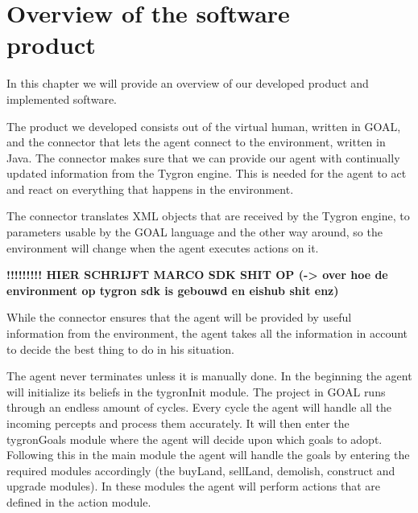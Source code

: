 \chapter[Overview of the software product]{Overview of the software \\ product}
In this chapter we will provide an overview of our developed product and implemented software.

The product we developed consists out of the virtual human, written in GOAL, and the connector that lets the agent connect to the environment, written in Java. The connector makes sure that we can provide our agent with continually updated information from the Tygron engine. This is needed for the agent to act and react on everything that happens in the environment.

The connector translates XML objects that are received by the Tygron engine, to parameters usable by the GOAL language and the other way around, so the environment will change when the agent executes actions on it.

\textbf{!!!!!!!!! HIER SCHRIJFT MARCO SDK SHIT OP (-> over hoe de environment op tygron sdk is gebouwd en eishub shit enz)}

While the connector ensures that the agent will be provided by useful information from the environment, the agent takes all the information in account to decide the best thing to do in his situation. 

The agent never terminates unless it is manually done. In the beginning the agent will initialize its beliefs in the tygronInit module. The project in GOAL runs through an endless amount of cycles. Every cycle the agent will handle all the incoming percepts and process them accurately. It will then enter the tygronGoals module where the agent will decide upon which goals to adopt. Following this in the main module the agent will handle the goals by entering the required modules accordingly (the buyLand, sellLand, demolish, construct and upgrade modules). In these modules the agent will perform actions that are defined in the action module.
\newpage

